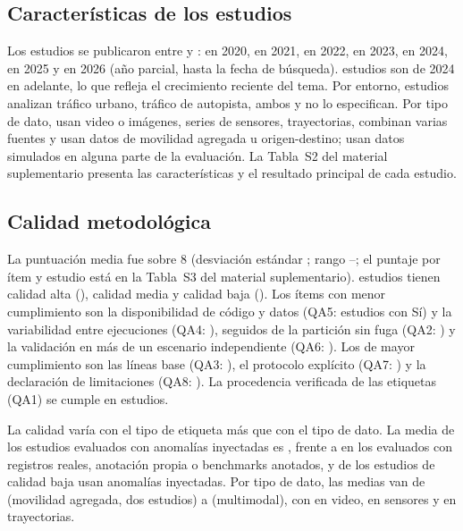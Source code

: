 \documentclass[12pt, a4paper]{article}
\begin{document}
\subsection{Características de los estudios}

Los \Nestudios{} estudios se publicaron entre \AnioMin{} y \AnioMax: \AnioA{} en 2020, \AnioB{} en 2021, \AnioC{} en 2022, \AnioD{} en 2023, \AnioE{} en 2024, \AnioF{} en 2025 y \AnioG{} en 2026 (año parcial, hasta la fecha de búsqueda). \NrecientesVeintidosVeintiseis{} estudios son de 2024 en adelante, lo que refleja el crecimiento reciente del tema. Por entorno, \Nurbano{} estudios analizan tráfico urbano, \Nautopista{} tráfico de autopista, \Nambos{} ambos y \NentornoNE{} no lo especifican. Por tipo de dato, \NdatoVideo{} usan video o imágenes, \NdatoSensores{} series de sensores, \NdatoTrayectorias{} trayectorias, \NdatoMultimodal{} combinan varias fuentes y \NdatoMovilidad{} usan datos de movilidad agregada u origen-destino; \NdatosSimuladosAny{} usan datos simulados en alguna parte de la evaluación. La Tabla~S2 del material suplementario presenta las características y el resultado principal de cada estudio.


\subsection{Calidad metodológica}

La puntuación media fue \QAmedia{} sobre 8 (desviación estándar \QAde; rango \QAmin--\QAmax; el puntaje por ítem y estudio está en la Tabla~S3 del material suplementario). \NaltaCalidad{} estudios tienen calidad alta (\IDaltaCalidad), \NmediaCalidad{} calidad media y \NbajaCalidad{} calidad baja (\IDbajaCalidad). Los ítems con menor cumplimiento son la disponibilidad de código y datos (QA5: \QACincosi{} estudios con Sí) y la variabilidad entre ejecuciones (QA4: \QACuatrosi), seguidos de la partición sin fuga (QA2: \QADossi) y la validación en más de un escenario independiente (QA6: \QASeissi). Los de mayor cumplimiento son las líneas base (QA3: \QATressi), el protocolo explícito (QA7: \QASietesi) y la declaración de limitaciones (QA8: \QAOchosi). La procedencia verificada de las etiquetas (QA1) se cumple en \QAUnosi{} estudios.

La calidad varía con el tipo de etiqueta más que con el tipo de dato. La media de los estudios evaluados con anomalías inyectadas es \QAetiqInyect{}, frente a \QAetiqReales{} en los evaluados con registros reales, anotación propia o benchmarks anotados, y \NbajaInyect{} de los \NbajaCalidad{} estudios de calidad baja usan anomalías inyectadas. Por tipo de dato, las medias van de \QAdatoMovilidad{} (movilidad agregada, dos estudios) a \QAdatoMultimodal{} (multimodal), con \QAdatoVideo{} en video, \QAdatoSensores{} en sensores y \QAdatoTrayectorias{} en trayectorias.
\end{document}

